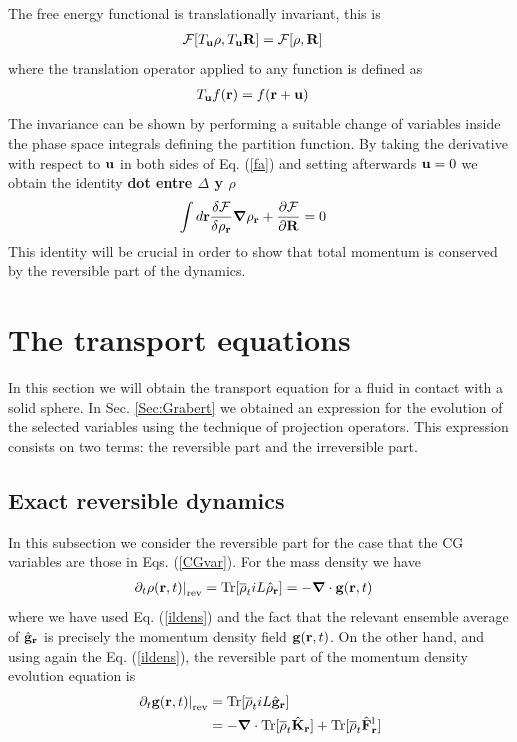 \documentclass[b5paper,openright,11pt]{book}
\newcommand{\Note}[1]{{\bf \color{red}#1}}    %
\begin{document}
The free energy functional is translationally invariant, this is
\begin{align}
  {\cal F}[T_{\bf u}\rho,T_{\bf u}{\bf R}]&=  {\cal F}[\rho,{\bf R}]
\label{fa}
\end{align}
where the translation operator applied to any function is defined as
\begin{align}
  T_{\bf u}f({\bf r})&=f({\bf r}+{\bf u})
\end{align}
The  invariance  can be  shown  by  performing  a suitable  change  of
variables  inside the  phase space  integrals defining  the partition
function.  By taking the derivative with  respect to ${\bf u}$ in both
sides of Eq.  (\ref{fa}) and  setting afterwards ${\bf u}=0$ we obtain
the identity
\Note{dot entre $\Delta$ y $\rho$}
\begin{align}
  \int d{\bf r}\frac{\delta {\cal F}}{\delta \rho_{\bf r}}
\boldsymbol{\nabla}\rho_{\bf r}&+\frac{\partial {\cal F}}{\partial {\bf R}}=0
\label{iden1}
\end{align}
This  identity will be  crucial in  order to  show that  total  momentum is
conserved by  the reversible part  of the dynamics.  

\section{The transport equations}
In this section we will obtain the transport equation for a fluid in contact with a solid sphere. In Sec. \ref{Sec:Grabert} we obtained an expression for the evolution of the selected variables using the technique of projection operators. This expression consists on two terms: the reversible part and the irreversible part. 
\subsection{Exact reversible dynamics}\label{Sec:ExactCont}
In this subsection we consider the reversible part for the case that the CG variables are those in Eqs. (\ref{CGvar}).
For the mass density we have
\begin{align}
\left.\partial_t \rho({\bf r},t)\right|_{\rm rev}
&=  {\rm Tr}[\overline{\rho}_t  iL\hat{\rho}_{\bf r}] 
=-\boldsymbol{\nabla}\cdot {\bf  g}({\bf r},t)
\label{conrho}
\end{align}
where we have used Eq. (\ref{ildens}) and the fact that the relevant
ensemble average of $\hat{\bf g}_{\bf  r}$ is precisely  the momentum
density field ${\bf g}({\bf r},t)$.  On the other hand, and using again the Eq. (\ref{ildens}), the reversible
part of the momentum density evolution equation is
\begin{align}
\left.\partial_t {\bf g}({\bf r},t)\right|_{\rm rev}
&=  {\rm Tr}[\overline{\rho}_t  iL\hat{{\bf g}}_{\bf r}] 
\nonumber\\
&=-\boldsymbol{\nabla}\cdot  {\rm Tr}[\overline{\rho}_t \hat{{\bf K}}_{\bf r}] 
+  {\rm Tr}[\overline{\rho}_t  \hat{\bf F}^{\rm l}_{\bf r}]
\label{grev1}
\end{align}
\end{document}
